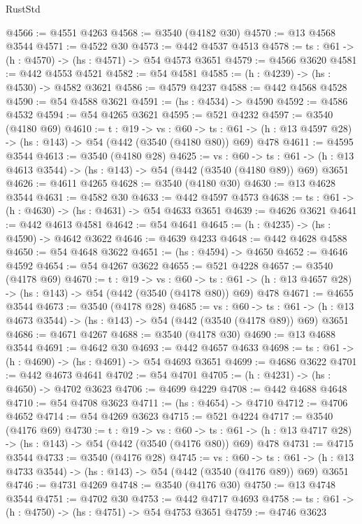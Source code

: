 \begin{lexlean}{RustStd}
\begin{coremodule}
@4566 := @4551 @4263
@4568 := @3540 (@4182 @30)
@4570 := @13 @4568 @3544
@4571 := @4522 @30
@4573 := @442 @4537 @4513
@4578 := {ts : @61} -> (h : @4570) -> (hs : @4571) -> @54 @4573 @3651
@4579 := @4566 @3620
@4581 := @442 @4553 @4521
@4582 := @54 @4581
@4585 := (h : @4239) -> (hs : @4530) -> @4582 @3621
@4586 := @4579 @4237
@4588 := @442 @4568 @4528
@4590 := @54 @4588 @3621
@4591 := (hs : @4534) -> @4590
@4592 := @4586 @4532
@4594 := @54 @4265 @3621
@4595 := @521 @4232
@4597 := @3540 (@4180 @69)
@4610 := {t : @19} ->
  {vs : @60} ->
  {ts : @61} -> (h : @13 @4597 @28) -> (hs : @143) -> @54 (@442 (@3540 (@4180 @80)) @69) @478
@4611 := @4595 @3544
@4613 := @3540 (@4180 @28)
@4625 := {vs : @60} ->
  {ts : @61} -> (h : @13 @4613 @3544) -> (hs : @143) -> @54 (@442 (@3540 (@4180 @89)) @69) @3651
@4626 := @4611 @4265
@4628 := @3540 (@4180 @30)
@4630 := @13 @4628 @3544
@4631 := @4582 @30
@4633 := @442 @4597 @4573
@4638 := {ts : @61} -> (h : @4630) -> (hs : @4631) -> @54 @4633 @3651
@4639 := @4626 @3621
@4641 := @442 @4613 @4581
@4642 := @54 @4641
@4645 := (h : @4235) -> (hs : @4590) -> @4642 @3622
@4646 := @4639 @4233
@4648 := @442 @4628 @4588
@4650 := @54 @4648 @3622
@4651 := (hs : @4594) -> @4650
@4652 := @4646 @4592
@4654 := @54 @4267 @3622
@4655 := @521 @4228
@4657 := @3540 (@4178 @69)
@4670 := {t : @19} ->
  {vs : @60} ->
  {ts : @61} -> (h : @13 @4657 @28) -> (hs : @143) -> @54 (@442 (@3540 (@4178 @80)) @69) @478
@4671 := @4655 @3544
@4673 := @3540 (@4178 @28)
@4685 := {vs : @60} ->
  {ts : @61} -> (h : @13 @4673 @3544) -> (hs : @143) -> @54 (@442 (@3540 (@4178 @89)) @69) @3651
@4686 := @4671 @4267
@4688 := @3540 (@4178 @30)
@4690 := @13 @4688 @3544
@4691 := @4642 @30
@4693 := @442 @4657 @4633
@4698 := {ts : @61} -> (h : @4690) -> (hs : @4691) -> @54 @4693 @3651
@4699 := @4686 @3622
@4701 := @442 @4673 @4641
@4702 := @54 @4701
@4705 := (h : @4231) -> (hs : @4650) -> @4702 @3623
@4706 := @4699 @4229
@4708 := @442 @4688 @4648
@4710 := @54 @4708 @3623
@4711 := (hs : @4654) -> @4710
@4712 := @4706 @4652
@4714 := @54 @4269 @3623
@4715 := @521 @4224
@4717 := @3540 (@4176 @69)
@4730 := {t : @19} ->
  {vs : @60} ->
  {ts : @61} -> (h : @13 @4717 @28) -> (hs : @143) -> @54 (@442 (@3540 (@4176 @80)) @69) @478
@4731 := @4715 @3544
@4733 := @3540 (@4176 @28)
@4745 := {vs : @60} ->
  {ts : @61} -> (h : @13 @4733 @3544) -> (hs : @143) -> @54 (@442 (@3540 (@4176 @89)) @69) @3651
@4746 := @4731 @4269
@4748 := @3540 (@4176 @30)
@4750 := @13 @4748 @3544
@4751 := @4702 @30
@4753 := @442 @4717 @4693
@4758 := {ts : @61} -> (h : @4750) -> (hs : @4751) -> @54 @4753 @3651
@4759 := @4746 @3623

\end{coremodule}
\end{lexlean}

